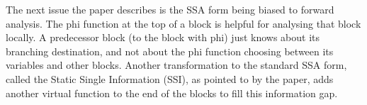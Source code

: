 The next issue the paper describes is the SSA form being biased to forward
analysis. The phi function at the top of a block is helpful for analysing that
block locally. A predecessor block (to the block with phi) just knows about its
branching destination, and not about the phi function choosing between its
variables and other blocks. Another transformation to the standard SSA form,
called the Static Single Information (SSI), as pointed to by the paper, adds
another virtual function to the end of the blocks to fill this information
gap. 






